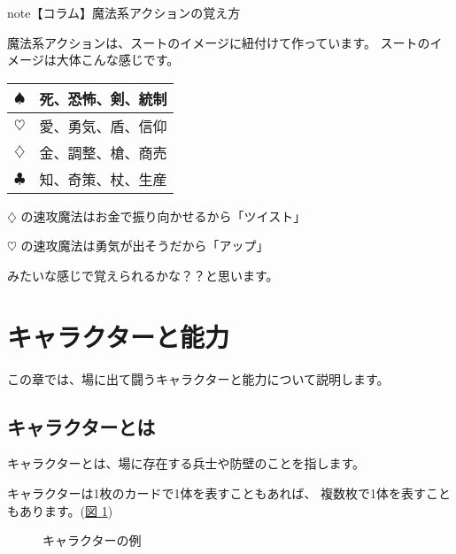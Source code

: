 \documentclass[letterpaper,10pt,dvipdfmx]{sphinxmanual}
\begin{document}
\begin{sphinxadmonition}{note}{【コラム】魔法系アクションの覚え方}

魔法系アクションは、スートのイメージに紐付けて作っています。
スートのイメージは大体こんな感じです。


\begin{savenotes}\sphinxattablestart
\centering
\begin{tabulary}{\linewidth}[t]{|T|T|}
\hline

{\normalsize $\spadesuit$} 
&
死、恐怖、剣、統制
\\
\hline
{\normalsize $\heartsuit$} 
&
愛、勇気、盾、信仰
\\
\hline
{\normalsize $\diamondsuit$} 
&
金、調整、槍、商売
\\
\hline
{\normalsize $\clubsuit$} 
&
知、奇策、杖、生産
\\
\hline
\end{tabulary}
\par
\sphinxattableend\end{savenotes}

{\normalsize $\diamondsuit$} の速攻魔法はお金で振り向かせるから「ツイスト」

{\normalsize $\heartsuit$} の速攻魔法は勇気が出そうだから「アップ」

みたいな感じで覚えられるかな？？と思います。
\end{sphinxadmonition}


\section{キャラクターと能力}
\label{\detokenize{common/04-character:id1}}\label{\detokenize{common/04-character::doc}}
この章では、場に出て闘うキャラクターと能力について説明します。


\subsection{キャラクターとは}
\label{\detokenize{common/04-character:id2}}
キャラクターとは、場に存在する兵士や防壁のことを指します。

キャラクターは1枚のカードで1体を表すこともあれば、
複数枚で1体を表すこともあります。(\hyperref[\detokenize{common/04-character:character}]{図 \ref{\detokenize{common/04-character:character}}})

\begin{figure}[htbp]
\centering
\capstart

\noindent{}
\caption{キャラクターの例}\label{\detokenize{common/04-character:id10}}\label{\detokenize{common/04-character:character}}\end{figure}
\end{document}
